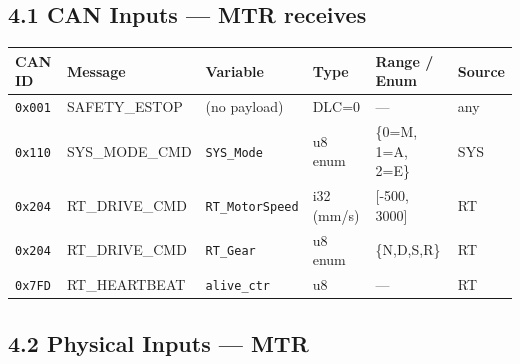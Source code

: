 \documentclass[12pt,a4paper,oneside]{report}
\begin{document}
\subsection{4.1 CAN Inputs --- MTR receives}\label{can-inputs-mtr-receives}

\begin{longtable}[]{@{}llllll@{}}
\toprule\noalign{}
CAN ID & Message & Variable & Type & Range / Enum & Source \\
\midrule\noalign{}
\endhead
\bottomrule\noalign{}
\endlastfoot
\texttt{0x001} & SAFETY\_ESTOP & (no payload) & DLC=0 & --- & any \\
\texttt{0x110} & SYS\_MODE\_CMD & \texttt{SYS\_Mode} & u8 enum & \{0=M, 1=A,
2=E\} & SYS \\
\texttt{0x204} & RT\_DRIVE\_CMD & \texttt{RT\_MotorSpeed} & i32 (mm/s) &
{[}-500, 3000{]} & RT \\
\texttt{0x204} & RT\_DRIVE\_CMD & \texttt{RT\_Gear} & u8 enum & \{N,D,S,R\} &
RT \\
\texttt{0x7FD} & RT\_HEARTBEAT & \texttt{alive\_ctr} & u8 & --- & RT \\
\end{longtable}

\subsection{4.2 Physical Inputs --- MTR}\label{physical-inputs-mtr}
\end{document}
